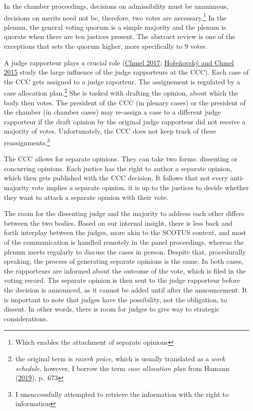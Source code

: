 \documentclass[
  11pt,
]{article}
\begin{document}
In the chamber proceedings, decisions on admissibility must be
unanimous, decisions on merits need not be, therefore, two votes are
necessary.\footnote{Which enables the attachment of separate opinions}
In the plenum, the general voting quorum is a simple majority and the
plenum is quorate when there are ten justices present. The abstract
review is one of the exceptions that sets the quorum higher, more
specifically to 9 votes.

A judge rapporteur plays a crucial role
(\protect\hyperlink{ref-chmelZpravodajoveSenatyVliv2017}{Chmel 2017};
\protect\hyperlink{ref-horenovskyProcessMakingConstitutional2015}{Hořeňovský
and Chmel 2015} study the large influence of the judge rapporteurs at
the CCC). Each case of the CCC gets assigned to a judge raporteur. The
assignement is regulated by a case allocation plan.\footnote{the
  original term is \emph{rozvrh práce}, which is usually translated as a
  \emph{work schedule}, however, I borrow the term \emph{case allocation
  plan} from Hamann
  (\protect\hyperlink{ref-hamannGermanFederalCourts2019}{2019}), p.~673}
She is tasked with drafting the opinion, about which the body then
votes. The president of the CCC (in plenary cases) or the president of
the chamber (in chamber cases) may re-assign a case to a different judge
rapporteur if the draft opinion by the original judge rapporteur did not
receive a majority of votes. Unfortunately, the CCC does not keep track
of these reassignments.\footnote{I unsuccessfully attempted to retrieve
  the information with the right to information}

The CCC allows for separate opinions. They can take two forms:
dissenting or concurring opinions. Each justice has the right to author
a separate opinion, which then gets published with the CCC decision. It
follows that not every anti-majority vote implies a separate opinion, it
is up to the justices to decide whether they want to attach a separate
opinion with their vote.

The room for the dissenting judge and the majority to address each other
differs between the two bodies. Based on our internal insight, there is
less back and forth interplay between the judges, more akin to the
SCOTUS context, and most of the communication is handled remotely in the
panel proceedings, whereas the plenum meets regularly to discuss the
cases in person. Despite that, procedurally speaking, the process of
generating separate opinions is the same. In both cases, the rapporteurs
are informed about the outcome of the vote, which is filed in the voting
record. The separate opinion is then sent to the judge rapporteur before
the decision is announced, as it cannot be added until after the
announcement. It is important to note that judges have the possibility,
not the obligation, to dissent. In other words, there is room for judges
to give way to strategic considerations.
\end{document}
